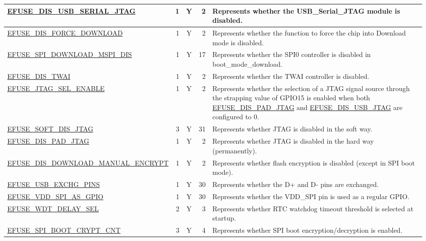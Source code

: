 \begin{longtable}[l]{ |m{8.2cm}|r|c|r|m{9cm}| }
    \hline
    \hyperref[fielddesc:EFUSEDISUSBSERIALJTAG]{EFUSE\_DIS\_USB\_SERIAL\_JTAG} & 1 & Y & 2 & Represents whether the USB\_Serial\_JTAG module is disabled.\\      
    \hline
    \hyperref[fielddesc:EFUSEDISFORCEDOWNLOAD]{EFUSE\_DIS\_FORCE\_DOWNLOAD} & 1 & Y & 2 & Represents whether the function to force the chip into Download mode is disabled.\\   
    \hline
    \hyperref[fielddesc:EFUSESPIDOWNLOADMSPIDIS]{EFUSE\_SPI\_DOWNLOAD\_MSPI\_DIS} & 1 & Y & 17 & Represents whether the SPI0 controller is disabled in boot\_mode\_download. \\  
    \hline    
    \hyperref[fielddesc:EFUSEDISTWAI]{EFUSE\_DIS\_TWAI} & 1 & Y & 2 & Represents whether the TWAI controller is disabled. \\  
    \hline
    \hyperref[fielddesc:EFUSEJTAGSELENABLE]{EFUSE\_JTAG\_SEL\_ENABLE} & 1 & Y & 2 & Represents whether the selection of a JTAG signal source through the strapping value of GPIO15 is enabled when both \hyperref[fielddesc:EFUSEDISPADJTAG]{EFUSE\_DIS\_PAD\_JTAG} and \hyperref[fielddesc:EFUSEDISUSBJTAG]{EFUSE\_DIS\_USB\_JTAG} are configured to 0.\\   
    \hline
    \hyperref[fielddesc:EFUSESOFTDISJTAG]{EFUSE\_SOFT\_DIS\_JTAG} & 3 & Y & 31 & Represents whether JTAG is disabled in the soft way.\\    
    \hline
    \hyperref[fielddesc:EFUSEDISPADJTAG]{EFUSE\_DIS\_PAD\_JTAG} & 1 & Y & 2 & Represents whether JTAG is disabled in the hard way (permanently). \\   
    \hline
    \hyperref[fielddesc:EFUSEDISDOWNLOADMANUALENCRYPT]{EFUSE\_DIS\_DOWNLOAD\_MANUAL\_ENCRYPT} &  1 & Y & 2 & Represents whether flash encryption is disabled (except in SPI boot mode).\\ 
    \hline
    \hyperref[fielddesc:EFUSEUSBEXCHGPINS]{EFUSE\_USB\_EXCHG\_PINS} & 1 & Y & 30 & Represents whether the D+ and D- pins are exchanged. \\
    \hline
    \hyperref[fielddesc:EFUSEVDDSPIASGPIO]{EFUSE\_VDD\_SPI\_AS\_GPIO} & 1 & Y & 30 & Represents whether the VDD\_SPI pin is used as a regular GPIO. \\
    \hline
    \hyperref[fielddesc:EFUSEWDTDELAYSEL]{EFUSE\_WDT\_DELAY\_SEL} & 2 & Y & 3 & Represents whether RTC watchdog timeout threshold is selected at startup.\\
    \hline
    \hyperref[fielddesc:EFUSESPIBOOTCRYPTCNT]{EFUSE\_SPI\_BOOT\_CRYPT\_CNT} & 3 & Y & 4 & Represents whether SPI boot encryption/decryption is enabled.\\

\end{longtable}
